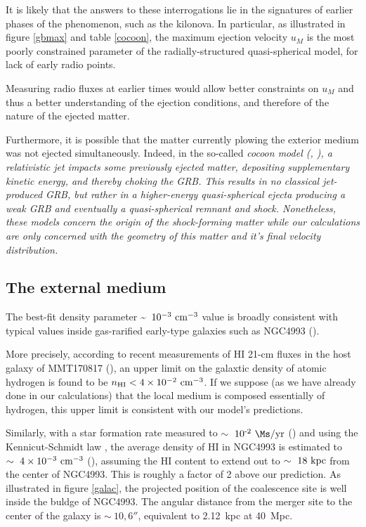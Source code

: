 It is likely that the answers to these interrogations lie in the signatures of earlier phases of the phenomenon, such as the kilonova. In particular, as illustrated in figure \ref{gbmax} and table \ref{cocoon}, the maximum ejection velocity $u_M$ is the most poorly constrained parameter of the radially-structured quasi-spherical model, for lack of early radio points. 



Measuring radio fluxes at earlier times would allow better constraints on $u_M$ and thus a better understanding of the ejection conditions, and therefore of the nature of the ejected matter.

Furthermore, it is possible that the matter currently plowing the exterior medium was not ejected simultaneously. Indeed, in the so-called \it{cocoon model} (\cite{42, 5}, ), a relativistic jet impacts some previously ejected matter, depositing supplementary kinetic energy, and thereby \it{choking} the GRB. This results in no classical jet-produced GRB, but rather in a higher-energy quasi-spherical ejecta producing a weak GRB and eventually a quasi-spherical remnant and shock. Nonetheless, these models concern the origin of the shock-forming matter while our calculations are only concerned with the geometry of this matter and it's final velocity distribution.


\subsection{The external medium}
The best-fit density parameter \sim~$10^{-3}~\rm{cm}^{-3}$ value is broadly consistent with typical values inside gas-rarified early-type galaxies such as NGC4993 (\cite{44}).

More precisely, according to recent measurements of HI 21-cm fluxes in the host galaxy of MMT170817 (\cite{12}), an upper limit on the galaxtic density of atomic hydrogen is found to be $n_{\rm{HI}} < 4 \times 10^{-2}~\rm{cm}^{-3}$. If we suppose (as we have already done in our calculations) that the local medium is composed essentially of hydrogen, this upper limit is consistent with our model's predictions.

Similarly, with a star formation rate measured to $\sim~10\sp{-2}~\Ms/\rm{yr}$ (\cite{9}) and using the Kennicut-Schmidt law  \cite{43}, the average density of HI in NGC4993 is estimated to $\sim~4 \times 10^{-3}~\rm{cm}^{-3}$ (\cite{12}), assuming the HI content to extend out to $\sim~18~\rm{kpc}$ from the center of NGC4993. This is roughly a factor of 2 above our prediction. As illustrated in figure \ref{galac}, the projected position of the coalescence site is well inside the buldge of NGC4993. The angular distance from the merger site to the center of the galaxy is $\sim~10,6''$, equivalent to 2.12~kpc at 40~Mpc.

